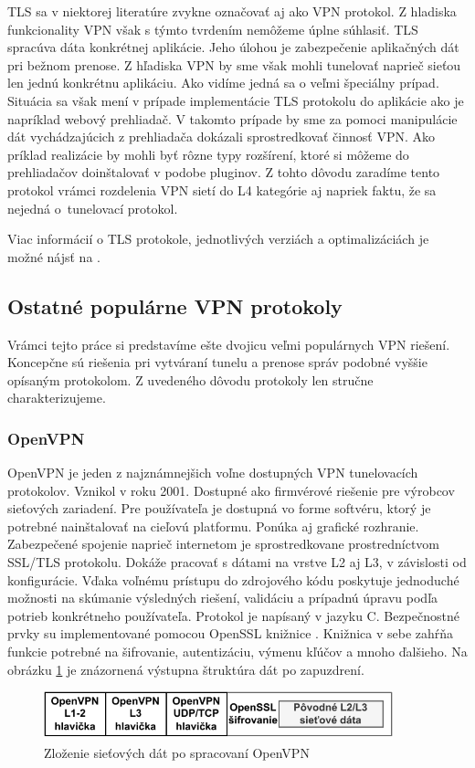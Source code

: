 TLS sa v niektorej literatúre zvykne označovať aj ako VPN protokol. Z hladiska funkcionality VPN však s týmto tvrdením nemôžeme úplne súhlasiť. TLS spracúva dáta konkrétnej aplikácie. Jeho úlohou je zabezpečenie aplikačných dát pri bežnom prenose. Z hľadiska VPN by sme však mohli tunelovať naprieč sieťou len jednú konkrétnu aplikáciu. Ako vidíme jedná sa o veľmi špeciálny prípad. Situácia sa však mení v prípade implementácie TLS protokolu do aplikácie ako je napríklad webový prehliadač. V takomto prípade by sme za pomoci manipulácie dát vychádzajúcich z prehliadača dokázali sprostredkovať činnosť VPN. Ako príklad realizácie by mohli byť rôzne typy rozšírení, ktoré si môžeme do prehliadačov doinštalovať v podobe pluginov. Z tohto dôvodu zaradíme tento protokol vrámci rozdelenia VPN sietí do L4 kategórie aj napriek faktu, že sa nejedná o~tunelovací protokol.
     
Viac informácií o TLS protokole, jednotlivých verziách a optimalizáciách je možné nájsť na \cite{tls}. 
\subsection{Ostatné populárne VPN protokoly}
Vrámci tejto práce si predstavíme ešte dvojicu veľmi populárnych VPN riešení. Koncepčne sú riešenia pri vytváraní tunelu a prenose správ podobné vyššie opísaným protokolom. Z uvedeného dôvodu protokoly len stručne charakterizujeme.
\subsubsection{OpenVPN}
OpenVPN \cite{ovpn} je jeden z najznámnejšich voľne dostupných VPN tunelovacích protokolov. Vznikol v roku 2001. Dostupné ako firmvérové riešenie pre výrobcov sieťových zariadení. Pre používateľa je dostupná vo forme softvéru, ktorý je potrebné nainštalovať na cieľovú platformu. Ponúka aj grafické rozhranie. Zabezpečené spojenie naprieč internetom je sprostredkovane prostredníctvom SSL/TLS protokolu. Dokáže pracovať s dátami na vrstve L2 aj L3, v závislosti od konfigurácie. Vďaka voľnému prístupu do zdrojového kódu poskytuje jednoduché možnosti na skúmanie výsledných riešení, validáciu a prípadnú úpravu podľa potrieb konkrétneho používateľa. Protokol je napísaný v jazyku C. Bezpečnostné prvky su implementované pomocou OpenSSL knižnice \cite{ossl}. Knižnica v sebe zahŕňa funkcie potrebné na šifrovanie, autentizáciu, výmenu kľúčov a mnoho ďalšieho. Na obrázku \ref{ovpnptstrc} je znázornená výstupna štruktúra dát po zapuzdrení. 
\begin{figure}[!h]
	\centering
	\includegraphics[width=0.9\textwidth]{figures/ovpnptstrc}
	\caption{Zloženie sieťových dát po spracovaní OpenVPN}
	\label{ovpnptstrc}
\end{figure}

